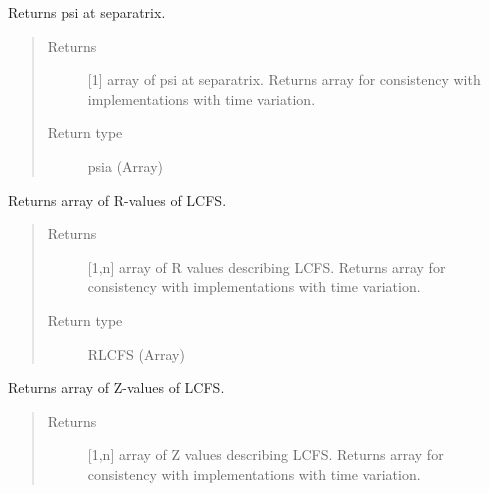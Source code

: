 \documentclass[letterpaper,10pt,english]{sphinxmanual}
\begin{document}
\begin{fulllineitems}
\begin{fulllineitems}
\label{\detokenize{eqtools:eqtools.eqdskreader.EqdskReader.getFluxLCFS}}
Returns psi at separatrix.
\begin{quote}\begin{description}
\item[{Returns}] \leavevmode
{[}1{]} array of psi at separatrix.  Returns array for
consistency with {\hyperref[\detokenize{eqtools:eqtools.core.Equilibrium}]{}}
implementations with time variation.

\item[{Return type}] \leavevmode
psia (Array)

\end{description}\end{quote}

\end{fulllineitems}


\begin{fulllineitems}
\label{\detokenize{eqtools:eqtools.eqdskreader.EqdskReader.getRLCFS}}
Returns array of R-values of LCFS.
\begin{quote}\begin{description}
\item[{Returns}] \leavevmode
{[}1,n{]} array of R values describing LCFS.  Returns
array for consistency with
{\hyperref[\detokenize{eqtools:eqtools.core.Equilibrium}]{}} implementations
with time variation.

\item[{Return type}] \leavevmode
RLCFS (Array)

\end{description}\end{quote}

\end{fulllineitems}


\begin{fulllineitems}
\label{\detokenize{eqtools:eqtools.eqdskreader.EqdskReader.getZLCFS}}
Returns array of Z-values of LCFS.
\begin{quote}\begin{description}
\item[{Returns}] \leavevmode
{[}1,n{]} array of Z values describing LCFS.  Returns
array for consistency with
{\hyperref[\detokenize{eqtools:eqtools.core.Equilibrium}]{}} implementations
with time variation.


\end{description}
\end{quote}
\end{fulllineitems}
\end{fulllineitems}
\end{document}
